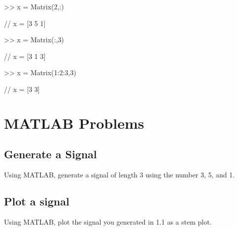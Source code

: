 \documentclass[11pt]{article}
\begin{document}
\vspace{4mm}

\begin{center}

>> x = Matrix(2,:)



\end{center}

\begin{center}


// x  =  [3 5 1]

\end{center}

\vspace{4mm}

\begin{center}

>> x = Matrix(:,3)



\end{center}

\begin{center}


// x  =  [3 1 3]

\end{center}

\vspace{4mm}

\begin{center}

>> x = Matrix(1:2:3,3)



\end{center}

\begin{center}


// x  =  [3 3]

\end{center}








\section{MATLAB Problems}
\subsection{Generate a Signal}

Using MATLAB, generate a signal of length 3 using the number 3, 5, and 1.

\subsection{Plot a signal}
Using MATLAB, plot the signal you generated in 1.1 as a stem plot.
\end{document}
